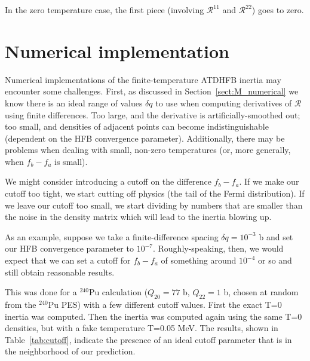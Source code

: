 \noindent In the zero temperature case, the first piece (involving $\mathcal{R}^{11}$ and $\mathcal{R}^{22}$) goes to zero.

\section{Numerical implementation}

Numerical implementations of the finite-temperature ATDHFB inertia may encounter some challenges. First, as discussed in Section~\ref{sect:M_numerical} we know there is an ideal range of values $\delta q$ to use when computing derivatives of $\mathcal{R}$ using finite differences. Too large, and the derivative is artificially-smoothed out; too small, and densities of adjacent points can become indistinguishable (dependent on the HFB convergence parameter). Additionally, there may be problems when dealing with small, non-zero temperatures (or, more generally, when $f_b-f_a$ is small).
%
%

We might consider introducing a cutoff on the difference $f_b-f_a$. If we make our cutoff too tight, we start cutting off physics (the tail of the Fermi distribution). If we leave our cutoff too small, we start dividing by numbers that are smaller than the noise in the density matrix which will lead to the inertia blowing up.

As an example, suppose we take a finite-difference spacing $\delta q = 10^{-3}$ b and set our HFB convergence parameter to $10^{-7}$. Roughly-speaking, then, we would expect that we can set a cutoff for $f_b-f_a$ of something around $10^{-4}$ or so and still obtain reasonable results.

This was done for a $^{240}$Pu calculation ($Q_{20}=77$ b, $Q_{22}=1$ b, chosen at random from the $^{240}$Pu PES) with a few different cutoff values. First the exact T=0 inertia was computed. Then the inertia was computed again using the same T=0 densities, but with a fake temperature T=0.05 MeV. The results, shown in Table~\ref{tab:cutoff}, indicate the presence of an ideal cutoff parameter that is in the neighborhood of our prediction.

